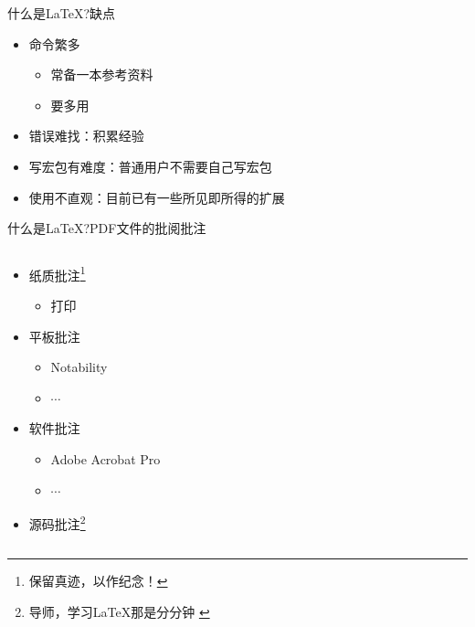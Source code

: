 \documentclass[fontset = none, xcolor=svgnames, t, aspectratio=169]{ctexbeamer}
\begin{document}
\begin{frame}[t]{什么是\LaTeX?}{缺点}
  \stretchon
  \begin{itemize}
  \item 命令繁多
    \begin{itemize}
    \item 常备一本参考资料
    \item 要\alert{多用}
    \end{itemize}
  \item 错误难找：积累经验
  \item 写宏包有难度：普通用户不需要自己写宏包
  \item 使用不直观：目前已有一些所见即所得的扩展
  \end{itemize}
  \stretchoff
\end{frame}

\begin{frame}[t]{什么是\LaTeX?}{PDF文件的批阅批注}
  \begin{columns}[c]
    \begin{spacing}{0.9}
    \begin{itemize}%
    \item \alert{纸质}批注\footnote[frame]{保留\alert{真迹}，以作纪念！}
      \begin{itemize}
      \item 打印
      \end{itemize}
    \item
      \alert{平板}批注\footnotemark[\value{footnote}]%
      \begin{itemize}
      \item Notability
      \item $\cdots$
      \end{itemize}
    \item \alert{软件}批注
      \begin{itemize}
      \item Adobe Acrobat Pro
      \item $\cdots$
      \end{itemize}
    \item \alert{源码}批注\footnote[frame]{导师，学习\LaTeX 那是\alert{分分钟
}}
\end{itemize}
\end{spacing}
\end{columns}
\end{frame}
\end{document}
